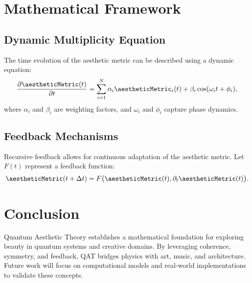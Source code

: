 \documentclass{article}
\theoremstyle{plain}
\begin{document}
\section{Mathematical Framework}

\subsection{Dynamic Multiplicity Equation}
The time evolution of the aesthetic metric can be described using a dynamic equation:
\begin{equation}
\frac{\partial \aestheticMetric(t)}{\partial t} = \sum_{i=1}^N \alpha_i \aestheticMetric_i(t) + \beta_i \cos(\omega_i t + \phi_i),
\end{equation}
where \(\alpha_i\) and \(\beta_i\) are weighting factors, and \(\omega_i\) and \(\phi_i\) capture phase dynamics.

\subsection{Feedback Mechanisms}
Recursive feedback allows for continuous adaptation of the aesthetic metric. Let \(F(t)\) represent a feedback function:
\begin{equation}
\aestheticMetric(t + \Delta t) = F\big(\aestheticMetric(t), \partial_t \aestheticMetric(t)\big).
\end{equation}

\section{Conclusion}
Quantum Aesthetic Theory establishes a mathematical foundation for exploring beauty in quantum systems and creative domains. By leveraging coherence, symmetry, and feedback, QAT bridges physics with art, music, and architecture. Future work will focus on computational models and real-world implementations to validate these concepts.

\nocite{*}


\end{document}
